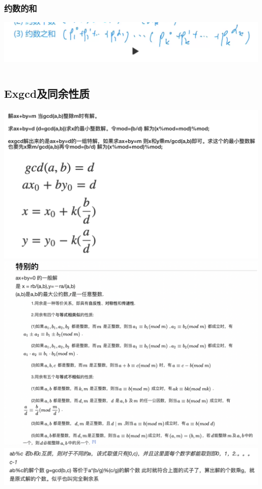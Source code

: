 \documentclass[a4paper,11pt]{article}
\begin{document}
\subsubsection{约数的和} %
\includegraphics[scale=0.6]{数论/约数的和.png}
\inputminted[breaklines]{c++}{数论/约数的和.cpp}
\subsection{Exgcd及同余性质} %
\includegraphics[scale=0.6]{数论/exgcd1.png}
\includegraphics[scale=0.6]{数论/exgcd2.png}
\includegraphics[scale=0.6]{数论/exgcd3.png}
\inputminted[breaklines]{c++}{数论/exgcd.cpp}
\end{document}
